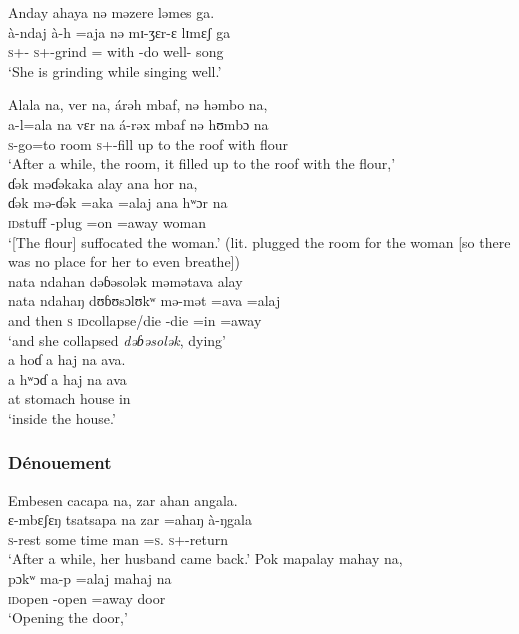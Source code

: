  \ea  Anday  ahaya  nə  məzere  ləmes  ga.\\
 \gll à-ndaj             à-h    =aja   nə  mɪ-ʒɛr-ɛ         lɪmɛʃ  ga\\
 \textsc{s}+{\PFV}-{\PRG}  \textsc{s}+{\PFV}-grind  ={\PLU}  with  {\NOM}{}-{do well}-{\CL}  song     {\ADJ}\\
 \glt ‘She is grinding while singing well.’
 \z
 
 \ea  Alala  na, ver  na, árəh  mbaf,  nə  həmbo  na,\\
 \gll a-l=ala na vɛr na á-rəx       mbaf    nə   hʊmbɔ  na\\
 \textsc{s}-go=to   {\PSP}   room     {\PSP}  \textsc{s}+{\IFV}-fill      {up to the roof}     with    flour  {\PSP}\\
 \glt ‘After a while, the room, it filled up to the roof with the flour,’\\
 
 \medskip\largerpage
  ɗək  məɗəkaka  alay  ana  hor  na,\\
 \gll ɗək         mə-ɗək    =aka    =alaj   ana      hʷɔr     na\\
 \textsc{id}stuff   {\NOM}{}-plug  =on    =away   {\DAT}  woman   {\PSP}\\
 \glt ‘[The flour] suffocated the woman.' (lit. plugged the room for the woman [so there was no place for her to even breathe])\\
 
 \medskip
  nata  ndahan  dəɓəsolək  məmətava  alay  \\
 \gll nata   ndahaŋ  dʊɓʊsɔlʊkʷ mə-mət  =ava  =alaj \\
 {and then}  \textsc{s}           \textsc{id}collapse/die    {\NOM}{}-die =in   =away   \\
 \glt ‘and she collapsed \textit{dəɓəsolək}, dying’\\

\medskip
  a  hoɗ  a  haj  na  ava.\\
 \gll a    hʷɔɗ  a  haj  na  ava\\
 at    stomach  {\GEN}   house   {\PSP}    in\\
 \glt ‘inside the house.’
 \z
 \subsubsection*{Dénouement}
 \ea Embesen  cacapa  na,  zar  ahan  angala.\\
 \gll ɛ{}-mbɛʃɛŋ    tsatsapa na    zar   =ahaŋ         à-ŋgala\\
 \textsc{s}-rest      {some time}     {\PSP}  man    =\textsc{s}.{\POSS}  \textsc{s}+{\PFV}-return\\
 \glt ‘After a while, her husband came back.’
 \z
 \ea  Pok  mapalay  mahay  na,\\
 \gll pɔkʷ ma-p    =alaj  mahaj na\\
 \textsc{id}open  {\NOM}{}-open  =away  door   {\PSP}\\
 \glt ‘Opening the door,'\\
 
